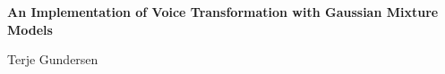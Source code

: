 \clearpage
\thispagestyle{plain}
{\begin{center}
\vspace*{1.7cm}
{\def\baselinestretch{1.2}\Huge\bf An Implementation of Voice Transformation with Gaussian Mixture Models \par}
\vspace{4cm}
{\begin{center}{\huge Terje Gundersen }\end{center}}
\end{center}}
\clearpage
